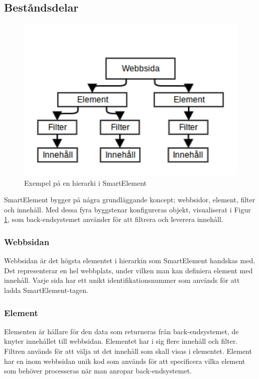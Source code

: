 \subsection{Beståndsdelar}

\begin{figure}[h!]
\centering
\includegraphics[width=120mm]{assets/images/smelementdatamodelabstract.png}
\caption{Exempel på en hierarki i SmartElement}
\label{abstractstructure}
\end{figure}

SmartElement bygger på några grundläggande koncept; webbsidor, element, filter och innehåll. Med dessa fyra byggstenar konfigureras objekt, visualiserat i Figur \ref{abstractstructure}, som back-endsystemet använder för att filtrera och leverera innehåll.

\subsubsection{Webbsidan}

Webbsidan är det högsta elementet i hierarkin som SmartElement handskas med. Det representerar en hel webbplats, under vilken man kan definiera element med innehåll. Varje sida har ett unikt identifikationsnummer som används för att ladda SmartElement-tagen.

\subsubsection{Element}

Elementen är hållare för den data som returneras från back-endsystemet, de knyter innehållet till webbsidan. Elementet har i sig flere innehåll och filter. Filtren används för att välja ut det innehåll som skall visas i elementet. Element har en inom webbsidan unik kod som används för att specificera vilka element som behöver processeras när man anropar back-endsystemet.

